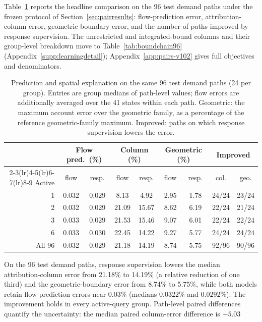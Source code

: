Table~\ref{tab:pathtable} reports the headline comparison on the 96
test demand paths under the frozen protocol of
Section~\ref{sec:pairresults}: flow-prediction error, attribution-column
error, geometric-boundary error, and the number of paths improved by
response supervision. The unrestricted and integrated-bound columns
and their group-level breakdown move to
Table~\ref{tab:boundchain96} (Appendix~\ref{supp:learningdetail});
Appendix~\ref{app:pairs-v102} gives full objectives and denominators.
\begin{table}[t]\centering\footnotesize
\caption{Prediction and spatial explanation on the same 96 test demand
paths (24 per group). Entries are group medians of path-level values;
flow errors are additionally averaged over the 41 states within each
path. Geometric: the maximum account error over the geometric family,
as a percentage of the reference geometric-family maximum. Improved:
paths on which response supervision lowers the error.}\label{tab:pathtable}
\setlength{\tabcolsep}{4.5pt}
\begin{tabular*}{\tblwidth}{@{\extracolsep{\fill}}rcc cc cc cc}
\toprule
& \multicolumn{2}{c}{Flow pred.\ (\%)} & \multicolumn{2}{c}{Column (\%)} & \multicolumn{2}{c}{Geometric (\%)} & \multicolumn{2}{c}{Improved}\\
\cmidrule(lr){2-3}\cmidrule(lr){4-5}\cmidrule(lr){6-7}\cmidrule(lr){8-9}
Active & flow & resp. & flow & resp. & flow & resp. & col. & geo.\\
\midrule
1 & 0.032 & 0.029 & 8.13 & 4.92 & 2.95 & 1.78 & 24/24 & 23/24\\
2 & 0.032 & 0.029 & 21.09 & 15.67 & 8.62 & 6.19 & 22/24 & 21/24\\
3 & 0.033 & 0.029 & 21.53 & 15.46 & 9.07 & 6.01 & 22/24 & 22/24\\
6 & 0.033 & 0.030 & 22.45 & 14.22 & 9.27 & 5.77 & 24/24 & 24/24\\
\midrule
All 96 & 0.032 & 0.029 & 21.18 & 14.19 & 8.74 & 5.75 & 92/96 & 90/96\\
\bottomrule\end{tabular*}\end{table}
On the 96 test demand paths, response supervision lowers the median
attribution-column error from 21.18\% to 14.19\% (a relative reduction
of one third) and the geometric-boundary error from 8.74\% to 5.75\%,
while both models retain flow-prediction errors near $0.03\%$ (medians
$0.0322\%$ and $0.0292\%$). The improvement holds in every
active-query group. Path-level paired differences quantify the
uncertainty: the median paired column-error difference is $-5.03$
